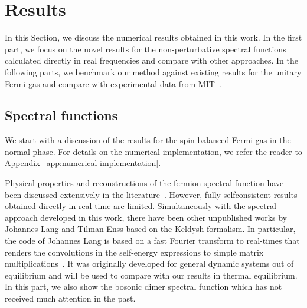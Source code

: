 \section{Results}
\label{section:results}

In this Section, we discuss the numerical results obtained in this work. In the first part, we focus on the novel results for the non-perturbative spectral functions calculated directly in real frequencies and compare with other approaches. In the following parts, we benchmark our method against existing results for the unitary Fermi gas and compare with experimental data from MIT~\cite{Mukherjee2019}.


\subsection*{Spectral functions}
\label{subsection:spectral-functions}

We start with a discussion of the results for the spin-balanced Fermi gas in the normal phase. For details on the numerical implementation, we refer the reader to Appendix~\ref{app:numerical-implementation}.

Physical properties and reconstructions of the fermion spectral function have been discussed extensively in the literature~\cite{Haussmann2009,Palestini2012,Reichl2015}. However, fully selfconsistent results obtained directly in real-time are limited. Simultaneously with the spectral approach developed in this work, there have been other unpublished works by Johannes Lang and Tilman Enss based on the Keldysh formalism. In particular, the code of Johannes Lang is based on a fast Fourier transform to real-times that renders the convolutions in the self-energy expressions to simple matrix multiplications~\cite{Lang2023}. It was originally developed for general dynamic systems out of equilibrium and will be used to compare with our results in thermal equilibrium. In this part, we also show the bosonic dimer spectral function which has not received much attention in the past.

